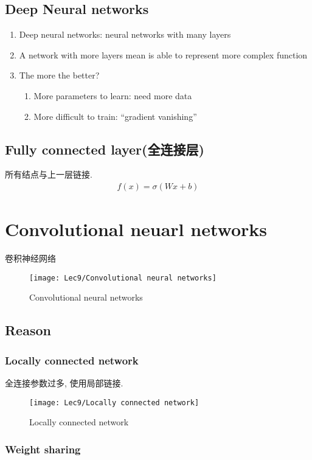 \subsection{Deep Neural networks}
\begin{enumerate}
    \item Deep neural networks: neural networks with many layers
    \item A network with more layers mean is able to represent more complex function
    \item The more the better?
    \begin{enumerate}
        \item More parameters to learn: need more data
        \item More difficult to train: ``gradient vanishing''
    \end{enumerate}
\end{enumerate}

\subsection{Fully connected layer(全连接层)}
所有结点与上一层链接. 
\begin{align*}
    f(x)=\sigma(Wx+b)
\end{align*}

\section{Convolutional neuarl networks}
卷积神经网络
\begin{figure}[H]
    \centering
    \texttt{[image: Lec9/Convolutional neural networks]}
    \caption{Convolutional neural networks}
\end{figure}
\subsection{Reason}

\subsubsection{Locally connected network}
全连接参数过多, 使用局部链接. 
\begin{figure}[H]
    \centering
    \texttt{[image: Lec9/Locally connected network]}
    \caption{Locally connected network}
\end{figure}

\subsubsection{Weight sharing}

